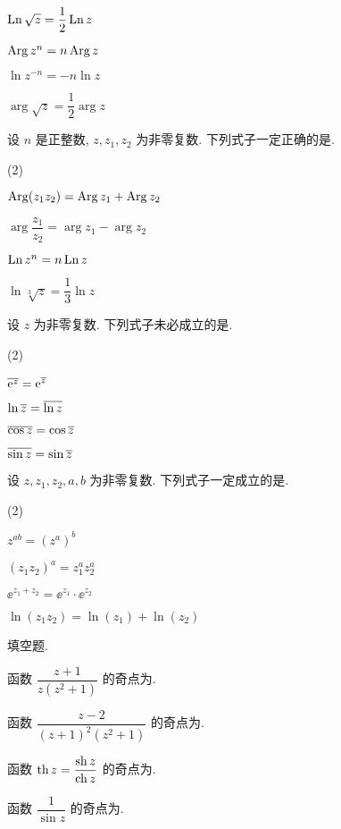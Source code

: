 \begin{homework}
\begin{homework}
\begin{exchoice}
      \item $\operatorname{Ln} \sqrt z=\dfrac12\operatorname{Ln} z$
      \item $\operatorname{Arg} z^n=n\operatorname{Arg} z$
      \item $\ln z^{-n}=-n\ln z$
      \item $\arg \sqrt z=\dfrac12\arg z$
    \end{exchoice}
    \item 设 $n$ 是正整数, $z,z_1,z_2$ 为非零复数. 下列式子一定正确的是\fillbrace{}.
    \begin{exchoice}(2)
      \item $\operatorname{Arg}(z_1z_2)=\operatorname{Arg} z_1+\operatorname{Arg} z_2$
      \item $\arg\dfrac{z_1}{z_2}=\arg z_1-\arg z_2$
      \item $\operatorname{Ln} z^n=n\operatorname{Ln} z$
      \item $\ln\sqrt[3]z=\dfrac13\ln z$
    \end{exchoice}
    \item 设 $z$ 为非零复数. 下列式子未必成立的是\fillbrace{}.
    \begin{exchoice}(2)
      \item $\overline{\mathrm{e}^z}=\mathrm{e}^{\overline z}$
      \item $\ln\overline{z}=\overline{\ln z}$
      \item $\overline{\cos z}=\cos{\overline z}$
      \item $\overline{\sin z}=\sin{\overline z}$
    \end{exchoice}
    \item 设 $z,z_1,z_2,a,b$ 为非零复数. 下列式子一定成立的是\fillbrace{}.
    \begin{exchoice}(2)
      \item $z^{ab}=(z^a)^b$
      \item $(z_1z_2)^a=z_1^az_2^a$
      \item $\ee^{z_1+z_2}=\ee^{z_1}\cdot \ee^{z_2}$
      \item $\ln(z_1z_2)=\ln(z_1)+\ln(z_2)$
    \end{exchoice}
  \end{homework}
  \item 填空题.
  \begin{homework}
    \item 函数 $\dfrac{z+1}{z(z^2+1)}$ 的奇点为\fillblank{}.
    \item 函数 $\dfrac{z-2}{(z+1)^2(z^2+1)}$ 的奇点为\fillblank{}.
    \item 函数 $\operatorname{th} z=\dfrac{\operatorname{sh} z}{\operatorname{ch} z}$ 的奇点为\fillblank{}.
    \item 函数 $\dfrac{1}{\sin z}$ 的奇点为\fillblank{}.

\end{homework}
\end{homework}
